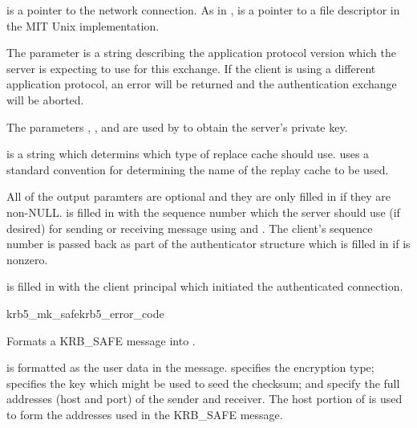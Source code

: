  is a pointer to the network connection.  As in
,  is a pointer to a file
descriptor in the MIT Unix implementation.

The parameter  is a string describing the
application protocol version which the server is expecting to use for
this exchange.  If the client is using a different application protocol,
an error will be returned and the authentication exchange will be
aborted.

The parameters , , and
 are used by  to obtain the
server's private key.

 is a string which determins which type of replace
cache  should use.  
uses a standard convention for determining the name of the replay cache
to be used.

All of the output paramters are optional and they are only filled in if
they are non-NULL.   is filled in with the
sequence number which the server should use (if desired) for sending or
receiving message using  and
.   The client's sequence number is passed back
as part of the authenticator structure which is filled in if
 is nonzero.  

 is filled in with the client principal which
initiated the authenticated connection.

\begin{funcdecl}{krb5_mk_safe}{krb5_error_code}{\funcin}
\funcout
{}
\end{funcdecl}

Formats a KRB_SAFE message into .

 is formatted as the user data in the message.
 specifies the encryption type; 
specifies the key which might be used to seed the checksum;
 and  specify the full
addresses (host and port) of the sender and receiver.  The host portion
of  is used to form the addresses used in the
KRB_SAFE message.

